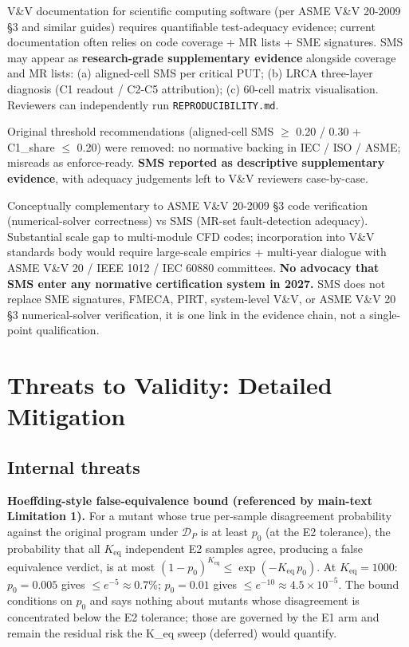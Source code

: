 \documentclass[review,12pt,authoryear]{elsarticle}
\begin{document}
V\&V documentation for scientific computing software (per ASME V\&V
20-2009 §3 and similar guides) requires quantifiable test-adequacy
evidence; current documentation often relies on code coverage + MR lists
+ SME signatures. SMS may appear as \textbf{research-grade supplementary
evidence} alongside coverage and MR lists: (a) aligned-cell SMS per
critical PUT; (b) LRCA three-layer diagnosis (C1 readout / C2-C5
attribution); (c) 60-cell matrix visualisation. Reviewers can
independently run \texttt{REPRODUCIBILITY.md}.

Original threshold recommendations (aligned-cell SMS $\geq$ 0.20 / 0.30 +
C1\_share $\leq$ 0.20) were removed: no normative backing in IEC / ISO /
ASME; misreads as enforce-ready. \textbf{SMS reported as descriptive
supplementary evidence}, with adequacy judgements left to V\&V reviewers
case-by-case.

Conceptually complementary to ASME V\&V 20-2009 §3 code verification
(numerical-solver correctness) vs SMS (MR-set fault-detection adequacy).
Substantial scale gap to multi-module CFD codes; incorporation into V\&V
standards body would require large-scale empirics + multi-year
dialogue with ASME V\&V 20 / IEEE 1012 / IEC 60880 committees.
\textbf{No advocacy that SMS enter any normative certification system in
2027.} SMS does not replace SME signatures, FMECA, PIRT, system-level
V\&V, or ASME V\&V 20 §3 numerical-solver verification, it is one
link in the evidence chain, not a single-point qualification.


\section{Threats to Validity: Detailed Mitigation}\label{f.-threats-to-validity-detailed-mitigation}

\subsection{Internal threats}\label{f.1-internal-threats}

\textbf{Hoeffding-style false-equivalence bound (referenced by
main-text Limitation 1).} For a mutant whose true per-sample
disagreement probability against the original program under $\mathcal{D}_P$ is
at least $p_0$ (at the E2 tolerance), the probability that all
$K_{\mathrm{eq}}$ independent E2 samples agree, producing a false
equivalence verdict, is at most $(1-p_0)^{K_{\mathrm{eq}}} \leq
\exp(-K_{\mathrm{eq}}\,p_0)$. At $K_{\mathrm{eq}} = 1000$: $p_0 =
0.005$ gives $\leq e^{-5} \approx 0.7\%$; $p_0 = 0.01$ gives $\leq
e^{-10} \approx 4.5 \times 10^{-5}$. The bound conditions on $p_0$ and
says nothing about mutants whose disagreement is concentrated below the
E2 tolerance; those are governed by the E1 arm and remain the residual
risk the K\_eq sweep (deferred) would quantify.
\end{document}
